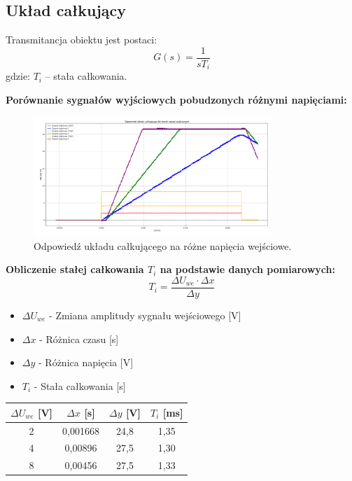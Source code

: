 \documentclass[12pt,a4paper]{article}
\begin{document}
	\subsection{Układ całkujący}
	Transmitancja obiektu jest postaci:
	\begin{equation}
		G(s) = \frac{1}{sT_i}
	\end{equation}
	gdzie: \(T_i\) – stała całkowania.
	
	\textbf{Porównanie sygnałów wyjściowych pobudzonych różnymi napięciami:}
	\begin{figure}[H]
		\centering
		\includegraphics[width=0.8\textwidth]{zdjecia/UkladCalk.png}
		\caption{Odpowiedź układu całkującego na różne napięcia wejściowe.}
		\label{fig:uklad_calk}
	\end{figure}
	
	\textbf{Obliczenie stałej całkowania $T_i$ na podstawie danych pomiarowych:}
	\[
	T_i = \frac{\Delta U_{we} \cdot \Delta x}{\Delta y}
	\]
	\begin{itemize}
		\item $\Delta U_{we}$ - Zmiana amplitudy sygnału wejściowego [V]
		\item $\Delta x$ - Różnica czasu [s]
		\item $\Delta y$ - Różnica napięcia [V]
		\item $T_i$ - Stała całkowania [s]
	\end{itemize}
	
	\begin{table}[h!]
		\centering
		\begin{tabular}{|c|c|c|c|}
			\hline
			$\Delta U_{we}$ [V] & $\Delta x$ [s] & $\Delta y$ [V] & $T_i$ [ms] \\
			\hline
			2 & 0,001668 & 24,8 & 1,35 \\
			4 & 0,00896 & 27,5 & 1,30 \\
			8 & 0,00456 & 27,5 & 1,33 \\
			\hline
		\end{tabular}
	\end{table}
	
\end{document}

